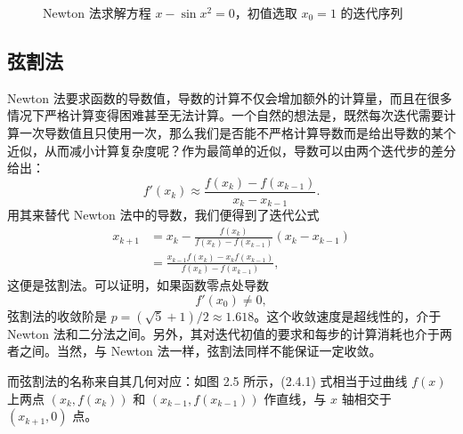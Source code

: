 \begin{figure}[htbp]
\centering
{}
\caption{Newton 法求解方程 $x-\sin x^2=0$，初值选取 $x_0=1$ 的迭代序列}
\label{fig:newton-cycle}
\end{figure}

\subsection{弦割法}

Newton 法要求函数的导数值，导数的计算不仅会增加额外的计算量，而且在很多情况下严格计算变得困难甚至无法计算。一个自然的想法是，既然每次迭代需要计算一次导数值且只使用一次，那么我们是否能不严格计算导数而是给出导数的某个近似，从而减小计算复杂度呢？作为最简单的近似，导数可以由两个迭代步的差分给出：
\[
f'(x_k)\approx\frac{f(x_k)-f(x_{k-1})}{x_k-x_{k-1}}.
\]
用其来替代 Newton 法中的导数，我们便得到了迭代公式
\begin{equation}
\begin{aligned}
x_{k+1}&=x_k-\frac{f(x_k)}{f(x_k)-f(x_{k-1})}(x_k-x_{k-1})\\
&=\frac{x_{k-1}f(x_k)-x_kf(x_{k-1})}{f(x_k)-f(x_{k-1})},
\end{aligned}
\tag{2.4.1}
\end{equation}
这便是弦割法。可以证明，如果函数零点处导数
\[
f'(x_0)\ne0,
\]
弦割法的收敛阶是 $p=(\sqrt5+1)/2\approx1.618$。这个收敛速度是超线性的，介于 Newton 法和二分法之间。另外，其对迭代初值的要求和每步的计算消耗也介于两者之间。当然，与 Newton 法一样，弦割法同样不能保证一定收敛。

而弦割法的名称来自其几何对应：如图 2.5 所示，(2.4.1) 式相当于过曲线 $f(x)$ 上两点 $(x_k,f(x_k))$ 和 $(x_{k-1},f(x_{k-1}))$ 作直线，与 $x$ 轴相交于 $(x_{k+1},0)$ 点。

